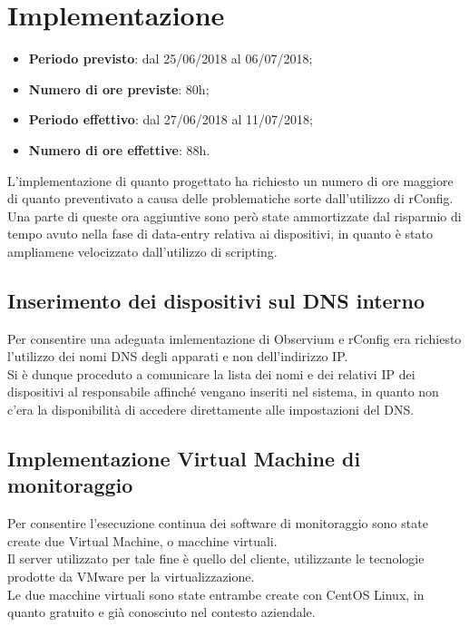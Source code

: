 \documentclass[Realizzazione.tex]{subfiles}
\begin{document}
\section{Implementazione}

\begin{itemize}
	\item \textbf{Periodo previsto}: dal 25/06/2018 al 06/07/2018;
	\item \textbf{Numero di ore previste}: 80h;
	\item \textbf{Periodo effettivo}: dal 27/06/2018 al 11/07/2018;
	\item \textbf{Numero di ore effettive}: 88h.
\end{itemize}

L'implementazione di quanto progettato ha richiesto un numero di ore maggiore di quanto preventivato a causa delle problematiche sorte dall'utilizzo di rConfig. Una parte di queste ora aggiuntive sono però state ammortizzate dal risparmio di tempo avuto nella fase di data-entry relativa ai dispositivi, in quanto è stato ampliamene velocizzato dall'utilizzo di scripting.

\subsection{Inserimento dei dispositivi sul DNS interno} 
Per consentire una adeguata imlementazione di Observium e rConfig era richiesto l'utilizzo dei nomi DNS degli apparati e non dell'indirizzo IP. \\
Si è dunque proceduto a comunicare la lista dei nomi e dei relativi IP dei dispositivi al responsabile affinché vengano inseriti nel sistema, in quanto non c'era la disponibilità di accedere direttamente alle impostazioni del DNS.

\subsection{Implementazione Virtual Machine di monitoraggio}
Per consentire l'esecuzione continua dei software di monitoraggio sono state create due Virtual Machine, o macchine virtuali.\\
Il server utilizzato per tale fine è quello del cliente, utilizzante le tecnologie prodotte da VMware per la virtualizzazione. \\
Le due macchine virtuali sono state entrambe create con CentOS Linux, in quanto gratuito e già conosciuto nel contesto aziendale.
\end{document}
